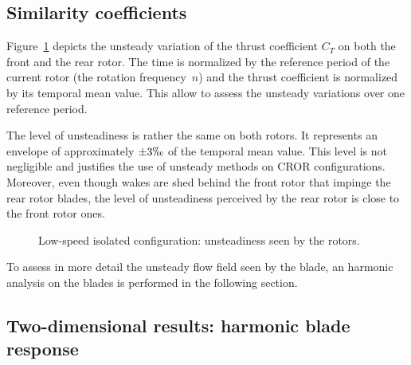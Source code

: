 
\subsection{Similarity coefficients}
\label{sub:dream_ls_hb_sim_coeff}

Figure~\ref{fig:dream_ls_hb_unst_coeff} depicts the
unsteady variation of the thrust coefficient $C_T$ on 
both the front and the rear rotor.
The time is 
normalized by the reference period of the current rotor 
(the rotation frequency~$n$) and the thrust coefficient is normalized
by its temporal mean value. This allow to assess the unsteady variations
over one reference period. 


The level of unsteadiness is rather
the same on both rotors. It represents an envelope of approximately
$\pm 3\permil$ of the temporal mean value. This level is not negligible and
justifies the use of unsteady methods on CROR configurations. 
Moreover, even though wakes are shed behind the front rotor
that impinge the rear rotor blades, the level of unsteadiness
perceived by the rear rotor is close to the front rotor ones.
\begin{figure}[htp]
  \centering
  \caption{Low-speed isolated configuration: unsteadiness seen by the rotors.}
  \label{fig:dream_ls_hb_unst_coeff}
\end{figure}

To assess in more detail the unsteady flow
field seen by the blade, an harmonic analysis on the
blades is performed in the following section.

\subsection{Two-dimensional results: harmonic blade response}
\label{sub:dream_ls_hb_blade_response}

